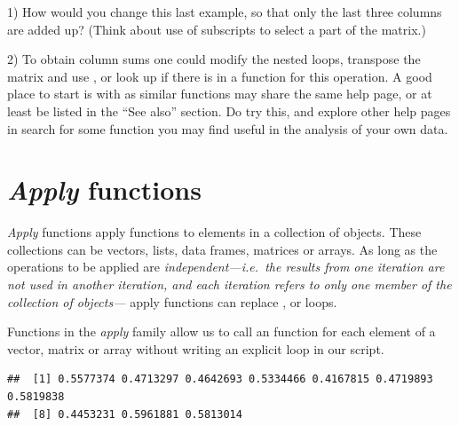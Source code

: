 \documentclass[krantz2]{krantz}\usepackage{knitr}%
\begin{document}
\begin{playground}
1) How would you change this last example, so that only the last three columns are added up? (Think about use of subscripts to select a part of the matrix.)

2) To obtain column sums one could modify the nested loops, transpose the matrix and use , or look up if there is in \Rlang a function for this operation. A good place to start is with  as similar functions may share the same help page, or at least be listed in the ``See also'' section. Do try this, and explore other help pages in search for some function you may find useful in the analysis of your own data.
\end{playground}

\section[Apply functions]{\emph{Apply} functions}\label{sec:data:apply}

\emph{Apply}
 functions apply functions to elements in a collection of \Rlang objects. These collections can be vectors, lists, data frames, matrices or arrays. As long as the operations to be applied are \emph{independent---i.e.\ the results from one iteration are not used in another iteration, and each iteration refers to only one member of the collection of objects---} apply functions can replace ,  or  loops.

Functions in the \emph{apply} family allow us to call an \Rlang function for each element of a vector, matrix or array without writing an explicit loop in our script.

\begin{knitrout}\footnotesize
{}\color{fgcolor}\begin{kframe}
\begin{alltt}
 \hlkwb{<-} \hlstd{(}\hlstd{(}\hlstd{),}  \hlstd{=} \hlstd{)}
  \hlstd{=} \hlstd{,}  
\end{alltt}
\begin{verbatim}
##  [1] 0.5577374 0.4713297 0.4642693 0.5334466 0.4167815 0.4719893 0.5819838
##  [8] 0.4453231 0.5961881 0.5813014
\end{verbatim}
\end{kframe}
\end{knitrout}
\end{document}
